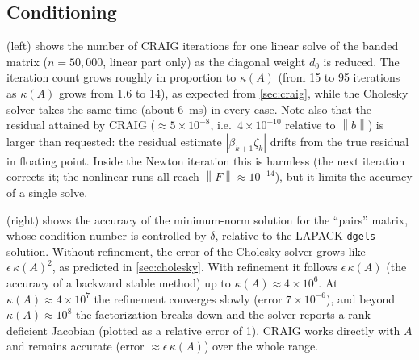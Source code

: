 \documentclass[11pt]{article}
\newcommand{\norm}[1]{\left\lVert #1 \right\rVert}
\newcommand{\code}[1]{\texttt{#1}}
\newcommand{\cond}{\kappa}
\begin{document}
\subsection{Conditioning}
\label{sec:exp-cond}
 (left) shows the number of CRAIG iterations for one linear solve of the banded matrix
($n = 50{,}000$, linear part only) as the diagonal weight $d_0$ is reduced. The iteration count grows roughly
in proportion to $\cond(A)$ (from 15 to 95 iterations as $\cond(A)$ grows from 1.6 to 14), as expected from
\cref{sec:craig}, while the Cholesky solver takes the same time (about 6~ms) in every case.
Note also that the residual attained by CRAIG ($\approx 5\times10^{-8}$, i.e.\ $4\times10^{-10}$ relative to
$\norm{b}$) is larger than requested: the residual estimate $|\beta_{k+1}\zeta_k|$ drifts from the true
residual in floating point. Inside the Newton iteration this is harmless (the next iteration corrects it;
the nonlinear runs all reach $\norm{F} \approx 10^{-14}$), but it limits the accuracy of a single solve.

 (right) shows the accuracy of the minimum-norm solution for the ``pairs'' matrix, whose
condition number is controlled by $\delta$, relative to the LAPACK \code{dgels} solution. Without
refinement, the error of the Cholesky solver grows like $\epsilon\, \cond(A)^2$, as predicted in
\cref{sec:cholesky}. With refinement it follows $\epsilon\,\cond(A)$ (the accuracy of a backward stable
method) up to $\cond(A) \approx 4\times10^{6}$. At $\cond(A) \approx 4\times 10^7$ the refinement converges
slowly (error $7\times10^{-6}$), and beyond $\cond(A) \approx 10^{8}$ the factorization breaks down and the solver
reports a rank-deficient Jacobian (plotted as a relative error of 1). CRAIG works directly with $A$ and remains
accurate (error $\approx \epsilon\,\cond(A)$) over the whole range.
\end{document}
